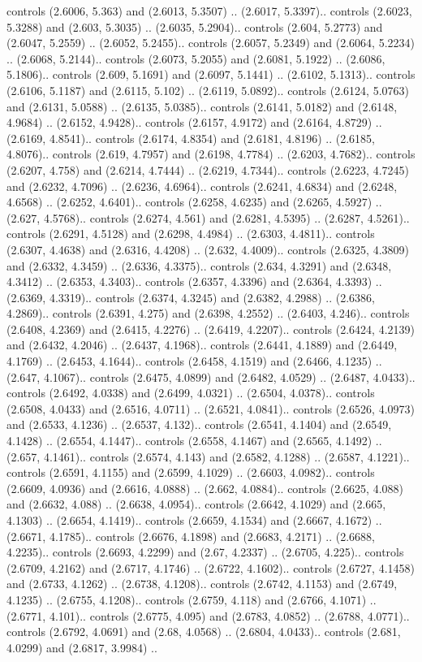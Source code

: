 controls (2.6006, 5.363) and (2.6013, 5.3507) .. (2.6017, 5.3397).. controls (2.6023, 5.3288) and (2.603, 5.3035) .. (2.6035, 5.2904).. controls (2.604, 5.2773) and (2.6047, 5.2559) .. (2.6052, 5.2455).. controls (2.6057, 5.2349) and (2.6064, 5.2234) .. (2.6068, 5.2144).. controls (2.6073, 5.2055) and (2.6081, 5.1922) .. (2.6086, 5.1806).. controls (2.609, 5.1691) and (2.6097, 5.1441) .. (2.6102, 5.1313).. controls (2.6106, 5.1187) and (2.6115, 5.102) .. (2.6119, 5.0892).. controls (2.6124, 5.0763) and (2.6131, 5.0588) .. (2.6135, 5.0385).. controls (2.6141, 5.0182) and (2.6148, 4.9684) .. (2.6152, 4.9428).. controls (2.6157, 4.9172) and (2.6164, 4.8729) .. (2.6169, 4.8541).. controls (2.6174, 4.8354) and (2.6181, 4.8196) .. (2.6185, 4.8076).. controls (2.619, 4.7957) and (2.6198, 4.7784) .. (2.6203, 4.7682).. controls (2.6207, 4.758) and (2.6214, 4.7444) .. (2.6219, 4.7344).. controls (2.6223, 4.7245) and (2.6232, 4.7096) .. (2.6236, 4.6964).. controls (2.6241, 4.6834) and (2.6248, 4.6568) .. (2.6252, 4.6401).. controls (2.6258, 4.6235) and (2.6265, 4.5927) .. (2.627, 4.5768).. controls (2.6274, 4.561) and (2.6281, 4.5395) .. (2.6287, 4.5261).. controls (2.6291, 4.5128) and (2.6298, 4.4984) .. (2.6303, 4.4811).. controls (2.6307, 4.4638) and (2.6316, 4.4208) .. (2.632, 4.4009).. controls (2.6325, 4.3809) and (2.6332, 4.3459) .. (2.6336, 4.3375).. controls (2.634, 4.3291) and (2.6348, 4.3412) .. (2.6353, 4.3403).. controls (2.6357, 4.3396) and (2.6364, 4.3393) .. (2.6369, 4.3319).. controls (2.6374, 4.3245) and (2.6382, 4.2988) .. (2.6386, 4.2869).. controls (2.6391, 4.275) and (2.6398, 4.2552) .. (2.6403, 4.246).. controls (2.6408, 4.2369) and (2.6415, 4.2276) .. (2.6419, 4.2207).. controls (2.6424, 4.2139) and (2.6432, 4.2046) .. (2.6437, 4.1968).. controls (2.6441, 4.1889) and (2.6449, 4.1769) .. (2.6453, 4.1644).. controls (2.6458, 4.1519) and (2.6466, 4.1235) .. (2.647, 4.1067).. controls (2.6475, 4.0899) and (2.6482, 4.0529) .. (2.6487, 4.0433).. controls (2.6492, 4.0338) and (2.6499, 4.0321) .. (2.6504, 4.0378).. controls (2.6508, 4.0433) and (2.6516, 4.0711) .. (2.6521, 4.0841).. controls (2.6526, 4.0973) and (2.6533, 4.1236) .. (2.6537, 4.132).. controls (2.6541, 4.1404) and (2.6549, 4.1428) .. (2.6554, 4.1447).. controls (2.6558, 4.1467) and (2.6565, 4.1492) .. (2.657, 4.1461).. controls (2.6574, 4.143) and (2.6582, 4.1288) .. (2.6587, 4.1221).. controls (2.6591, 4.1155) and (2.6599, 4.1029) .. (2.6603, 4.0982).. controls (2.6609, 4.0936) and (2.6616, 4.0888) .. (2.662, 4.0884).. controls (2.6625, 4.088) and (2.6632, 4.088) .. (2.6638, 4.0954).. controls (2.6642, 4.1029) and (2.665, 4.1303) .. (2.6654, 4.1419).. controls (2.6659, 4.1534) and (2.6667, 4.1672) .. (2.6671, 4.1785).. controls (2.6676, 4.1898) and (2.6683, 4.2171) .. (2.6688, 4.2235).. controls (2.6693, 4.2299) and (2.67, 4.2337) .. (2.6705, 4.225).. controls (2.6709, 4.2162) and (2.6717, 4.1746) .. (2.6722, 4.1602).. controls (2.6727, 4.1458) and (2.6733, 4.1262) .. (2.6738, 4.1208).. controls (2.6742, 4.1153) and (2.6749, 4.1235) .. (2.6755, 4.1208).. controls (2.6759, 4.118) and (2.6766, 4.1071) .. (2.6771, 4.101).. controls (2.6775, 4.095) and (2.6783, 4.0852) .. (2.6788, 4.0771).. controls (2.6792, 4.0691) and (2.68, 4.0568) .. (2.6804, 4.0433).. controls (2.681, 4.0299) and (2.6817, 3.9984) .. 